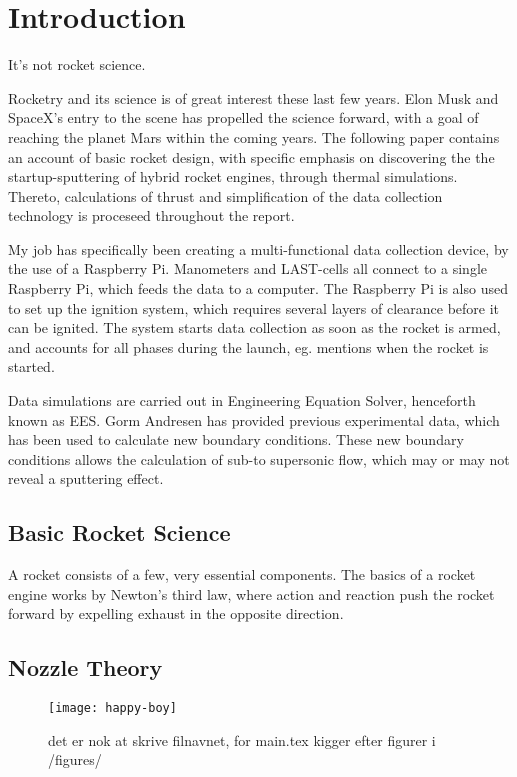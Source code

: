 \chapter{Introduction}

It's not rocket science.

Rocketry and its science is of great interest these last few years. Elon Musk and SpaceX's entry to the scene has propelled the science forward, with a goal of reaching the planet Mars within the coming years. The following paper contains an account of basic rocket design, with specific emphasis on discovering the the startup-sputtering of hybrid rocket engines, through thermal simulations. Thereto, calculations of thrust and simplification of the data collection technology is proceseed throughout the report.

My job has specifically been creating a multi-functional data collection device, by the use of a Raspberry Pi. Manometers and LAST-cells all connect to a single Raspberry Pi, which feeds the data to a computer. The Raspberry Pi is also used to set up the ignition system, which requires several layers of clearance before it can be ignited. The system starts data collection as soon as the rocket is armed, and accounts for all phases during the launch, eg. mentions when the rocket is started.

Data simulations are carried out in Engineering Equation Solver, henceforth known as EES. Gorm Andresen has provided previous experimental data, which has been used to calculate new boundary conditions. These new boundary conditions allows the calculation of sub-to supersonic flow, which may or may not reveal a sputtering effect.

\section{Basic Rocket Science}

A rocket consists of a few, very essential components. The basics of a rocket engine works by Newton's third law, where action and reaction push the rocket forward by expelling exhaust in the opposite direction.

\section{Nozzle Theory}

\begin{figure}
\texttt{[image: happy-boy]}
\caption{det er nok at skrive filnavnet, for main.tex kigger efter figurer i /figures/}
\label{fig:yyy}
\end{figure}
